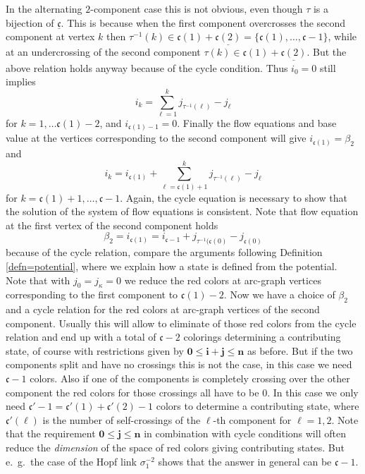 \documentclass[11pt]{article}
\theoremstyle{definition}
\theoremstyle{remark}
\theoremstyle{remark}
\begin{document}
In the alternating $2$-component case this is not obvious, even though  $\tau $ is a bijection of $\underline{\mathfrak{c}}$. This is because when the first component overcrosses the second component at vertex $k$ then $\tau^{-1}(k)\in \mathfrak{c}(1)+\underline{\mathfrak{c}(2)}=\{\mathfrak{c}(1),\ldots ,\mathfrak{c}-1\}$, while at an undercrossing of the second component $\tau (k) \in \mathfrak{c}(1)+\underline{\mathfrak{c}(2)}$. But the above relation holds anyway because of the cycle condition. Thus $i_0=0$ still implies 
\begin{equation}\label{eq=cycle i}
i_k=\sum_{\ell =1}^kj_{\tau^{-1}(\ell )}-j_{\ell }
\end{equation}
for $k=1,\ldots \mathfrak{c}(1)-2$, and $i_{\mathfrak{c}(1)-1}=0$.
Finally the flow equations and base value at the vertices corresponding to the second component will give $i_{\mathfrak{c}(1)}=\beta_2$ and 
$$i_k=i_{\mathfrak{c}(1)}+\sum_{\ell =\mathfrak{c}(1)+1}^kj_{\tau^{-1}(\ell )}-j_{\ell }$$
for $k=\mathfrak{c}(1)+1,\ldots ,\mathfrak{c}-1$. Again, the cycle equation is necessary to show that the solution of the system of flow equations is consistent. Note that flow equation at the first vertex of the second component holds 
$$\beta_2=i_{\mathfrak{c}(1)}=i_{\mathfrak{c}-1}+j_{\tau^{-1}(\mathfrak{c}(0)}-j_{\mathfrak{c}(0)}$$
because of the cycle relation, compare the arguments following Definition \ref{defn=potential}, where we explain how a state is defined from the potential. Note that with $j_0=j_{\kappa }=0$ we reduce the red colors at arc-graph vertices corresponding to the first component to $\mathfrak{c}(1)-2$. Now we have a choice of $\beta_2$ and a cycle relation for the red colors at arc-graph vertices of the second component. Usually this will allow to eliminate of those red colors from the cycle relation and end up with a total of $\mathfrak{c}-2$ colorings determining a contributing state, of course with restrictions given by
$\mathbf{0}\leq \mathbf{i}+\mathbf{j}\leq \mathbf{n}$ as before. But if the two components split and have no crossings this is not the case, in this case we need $\mathfrak{c}-1$ colors. Also if one of the components is completely crossing over the other component the red colors for those crossings all have to be $0$. In this case we only need $\mathfrak{c}'-1=\mathfrak{c}'(1)
+\mathfrak{c}'(2)-1$ colors to determine a contributing state, where $\mathfrak{c}'(\ell )$ is the number of self-crossings of the $\ell $-th component for $\ell =1,2$. Note that the requirement $\mathbf{0}\leq \mathbf{j}\leq \mathbf{n}$ in combination with cycle conditions will often reduce the \textit{dimension} of the space of red colors giving contributing states. But e.\ g.\  the case of the Hopf link $\sigma_1^{-2}$ shows that the answer in general can be $\mathfrak{c}-1$. 
\end{document}
